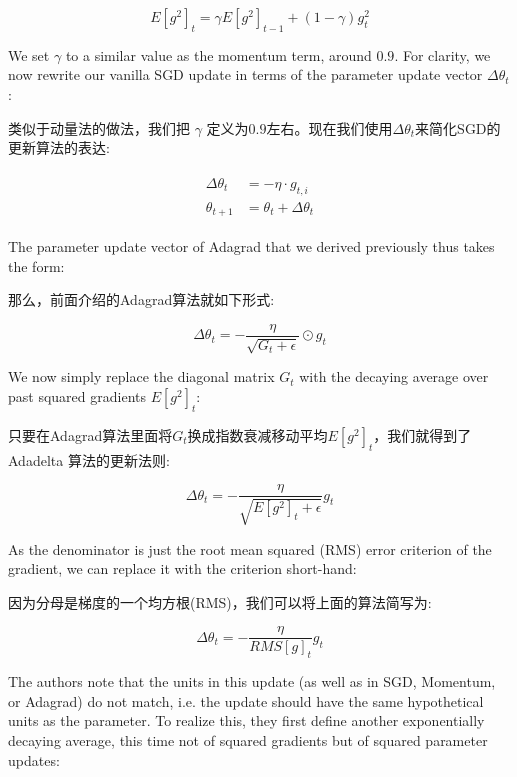 \documentclass{article}
\begin{document}
\begin{equation}
E[g^2]_t = \gamma E[g^2]_{t-1} + (1 - \gamma) g^2_t
\end{equation}

We set $\gamma$ to a similar value as the momentum term, around $0.9$. For clarity, we now rewrite our vanilla SGD update in terms of the parameter update vector $ \Delta \theta_t $:

类似于动量法的做法，我们把 $\gamma$ 定义为$0.9$左右。现在我们使用$ \Delta \theta_t $来简化SGD的更新算法的表达:

\begin{align}
\begin{split}
\Delta \theta_t &= - \eta \cdot g_{t, i}\\
\theta_{t+1} &= \theta_t + \Delta \theta_t
\end{split}
\end{align}

The parameter update vector of Adagrad that we derived previously thus takes the form:

那么，前面介绍的Adagrad算法就如下形式:

\begin{equation}
\Delta \theta_t = - \frac{\eta}{\sqrt{G_{t} + \epsilon}} \odot g_{t}
\end{equation}

We now simply replace the diagonal matrix $G_{t}$ with the decaying average over past squared gradients $E[g^2]_t$:

只要在Adagrad算法里面将$G_{t}$换成指数衰减移动平均$E[g^2]_t$，我们就得到了Adadelta 算法的更新法则:

\begin{equation}
\Delta \theta_t = - \frac{\eta}{\sqrt{E[g^2]_t + \epsilon}} g_{t}
\end{equation}

As the denominator is just the root mean squared (RMS) error criterion of the gradient, we can replace it with the criterion short-hand:

因为分母是梯度的一个均方根(RMS)，我们可以将上面的算法简写为:

\begin{equation}
\Delta \theta_t = - \frac{\eta}{RMS[g]_{t}} g_t
\end{equation}

The authors note that the units in this update (as well as in SGD, Momentum, or Adagrad) do not match, i.e. the update should have the same hypothetical units as the parameter. To realize this, they first define another exponentially decaying average, this time not of squared gradients but of squared parameter updates:
\end{document}
